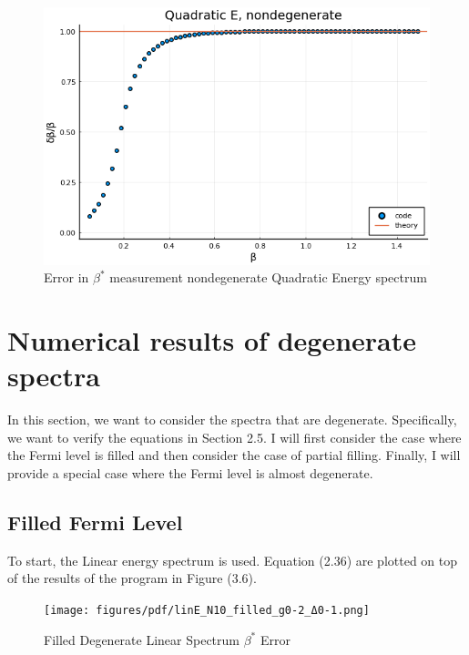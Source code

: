 \begin{figure}[H]
    \centering
    \includegraphics[scale=0.75]{figures/pdf/quadEnondeg.png}
    \caption{Error in $\beta^*$ measurement nondegenerate Quadratic Energy spectrum}
\end{figure}


\section{Numerical results of degenerate spectra}
In this section, we want to consider the spectra that are degenerate. Specifically, we want to verify the equations in Section 2.5. I will first consider the case where the Fermi level is filled and then consider the case of partial filling. Finally, I will provide a special case where the Fermi level is almost degenerate. 
\subsection{Filled Fermi Level}
To start, the Linear energy spectrum is used. Equation (2.36) are plotted on top of the results of the program in Figure (3.6).  

\begin{figure}[H]
    \centering
    \texttt{[image: figures/pdf/linE\_N10\_filled\_g0-2\_Δ0-1.png]}
    \caption{Filled Degenerate Linear Spectrum $\beta^*$ Error}
    \label{fig:Filled}
\end{figure}

